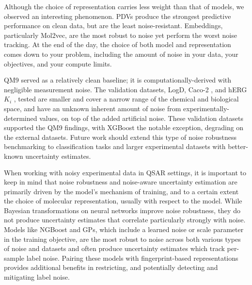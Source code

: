 Although the choice of representation carries less weight than that of models, we observed an interesting phenomenon. PDVs produce the strongest predictive performance on clean data, but are the least noise-resistant. Embeddings, particularly Mol2vec, are the most robust to noise yet perform the worst noise tracking. At the end of the day, the choice of both model and representation comes down to your problem, including the amount of noise in your data, your objectives, and your compute limits. 

QM9 served as a relatively clean baseline; it is computationally-derived with negligible measurement noise. The validation datasets, LogD, Caco-2 \citep{openadmet}, and hERG $K_i$ \citep{Zdrazil2023}, tested are smaller and cover a narrow range of the chemical and biological space, and have an unknown inherent amount of noise from experimentally-determined values, on top of the added artificial noise. These validation datasets supported the QM9 findings, with XGBoost the notable exception, degrading on the external datasets. Future work should extend this type of noise robustness benchmarking to classification tasks and larger experimental datasets with better-known uncertainty estimates.

When working with noisy experimental data in QSAR settings, it is important to keep in mind that noise robustness and noise-aware uncertainty estimation are primarily driven by the model's mechanism of training, and to a certain extent the choice of molecular representation, usually with respect to the model. While Bayesian transformations on neural networks improve noise robustness, they do not produce uncertainty estimates that correlate particularly strongly with noise. Models like NGBoost and GPs, which include a learned noise or scale parameter in the training objective, are the most robust to noise across both various types of noise and datasets and often produce uncertainty estimates which track per-sample label noise. Pairing these models with fingerprint-based representations provides additional benefits in restricting, and potentially detecting and mitigating label noise. 

